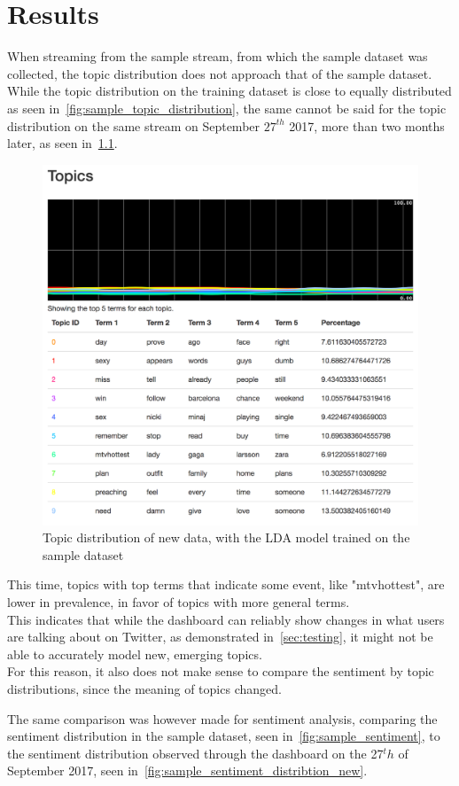 \chapter{Results}
\label{ch:results}

When streaming from the sample stream, from which the sample dataset was collected,
the topic distribution does not approach that of the sample dataset.
While the topic distribution on the training dataset is close to equally distributed as seen in~\ref{fig:sample_topic_distribution},
the same cannot be said for the topic distribution on the same stream on September $27^{th}$ 2017, more than two months later,
as seen in~\ref{fig:sample_topic_distribtion_new}.

\begin{figure}
    \centering
    \caption{Topic distribution of new data, with the LDA model trained on the sample dataset}
    \label{fig:sample_topic_distribtion_new}
    \includegraphics[width=\textwidth]{../images/dashboard_topics_sample.png}
\end{figure}

This time, topics with top terms that indicate some event, like "mtvhottest", are lower in prevalence,
in favor of topics with more general terms.\\
This indicates that while the dashboard can reliably show changes in what users are talking about on Twitter,
as demonstrated in~\ref{sec:testing},
it might not be able to accurately model new, emerging topics.
\\
For this reason, it also does not make sense to compare the sentiment by topic distributions,
since the meaning of topics changed.
\par
The same comparison was however made for sentiment analysis, comparing the sentiment distribution in the sample dataset, seen in~\ref{fig:sample_sentiment},
to the sentiment distribution observed through the dashboard on the 27$^th$ of September 2017, seen in~\ref{fig:sample_sentiment_distribtion_new}.


